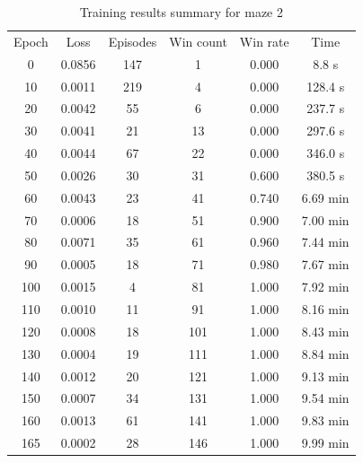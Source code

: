 \documentclass[a4paper]{article}    %
\begin{document}
\begin{table}[H]
    \begin{center}
        \begin{tabular}{|c|c|c|c|c|c|}
            \cline{1-6}
            \rowcolor{Gray}
            Epoch & Loss & Episodes & Win count & Win rate & Time \\
            \cline{1-6}
              0 & 0.0856 & 147 &   1 & 0.000 &   8.8 s  \\
             10 & 0.0011 & 219 &   4 & 0.000 & 128.4 s  \\
             20 & 0.0042 &  55 &   6 & 0.000 & 237.7 s  \\
             30 & 0.0041 &  21 &  13 & 0.000 & 297.6 s  \\
             40 & 0.0044 &  67 &  22 & 0.000 & 346.0 s  \\
             50 & 0.0026 &  30 &  31 & 0.600 & 380.5 s  \\
             60 & 0.0043 &  23 &  41 & 0.740 & 6.69 min \\
             70 & 0.0006 &  18 &  51 & 0.900 & 7.00 min \\
             80 & 0.0071 &  35 &  61 & 0.960 & 7.44 min \\
             90 & 0.0005 &  18 &  71 & 0.980 & 7.67 min \\
            100 & 0.0015 &   4 &  81 & 1.000 & 7.92 min \\
            110 & 0.0010 &  11 &  91 & 1.000 & 8.16 min \\
            120 & 0.0008 &  18 & 101 & 1.000 & 8.43 min \\
            130 & 0.0004 &  19 & 111 & 1.000 & 8.84 min \\
            140 & 0.0012 &  20 & 121 & 1.000 & 9.13 min \\
            150 & 0.0007 &  34 & 131 & 1.000 & 9.54 min \\
            160 & 0.0013 &  61 & 141 & 1.000 & 9.83 min \\
            165 & 0.0002 &  28 & 146 & 1.000 & 9.99 min \\
            \cline{1-6}
        \end{tabular}
    \end{center}
    \caption{Training results summary for maze 2}
    \label{tab:maze2-results}
\end{table}

\end{document}
